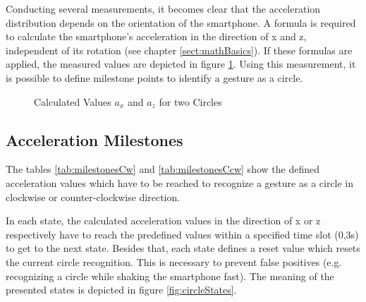 Conducting several measurements, it becomes clear that the acceleration
distribution depends on the orientation of the smartphone. A formula is required
to calculate the smartphone's acceleration in the direction of x and z,
independent of its rotation (see chapter \ref{sect:mathBasics}). If these
formulas are applied, the measured values are depicted in figure
\ref{fig:finalAcc}. Using this measurement, it is possible to define milestone
points to identify a gesture as a circle.
 
\begin{figure}
\centering
\captionsetup{justification=centering}
\caption{Calculated Values $a_x$ and $a_z$ for two Circles}
\label{fig:finalAcc}
\end{figure}

\subsection{Acceleration Milestones}
\label{sec:accmilestones}

The tables \ref{tab:milestonesCw} and \ref{tab:milestonesCcw} show the
defined acceleration values which have to be reached to recognize a gesture as a
circle in clockwise or counter-clockwise direction.

In each state, the calculated acceleration values in the direction of x or z
respectively have to reach the predefined values within a specified time slot
(0,3s) to get to the next state. Besides that, each state defines a reset value
which resets the current circle recognition. This is necessary to prevent false
positives (e.g. recognizing a circle while shaking the smartphone fast). The
meaning of the presented states is depicted in figure \ref{fig:circleStates}.

